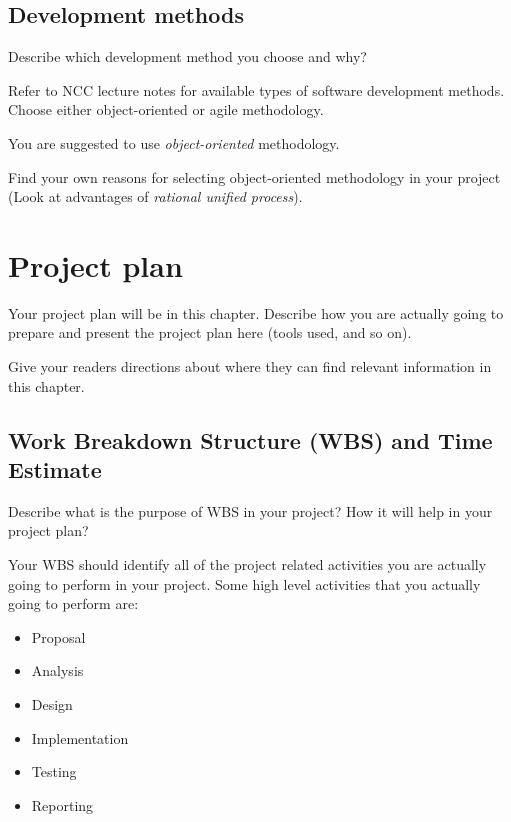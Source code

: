 \documentclass[12pt, a4paper]{report}
\begin{document}
\section{Development methods} %
\label{sec:development_methods}
Describe which development method you choose and why?

Refer to NCC lecture notes for available types of software development methods. Choose either object-oriented or agile methodology.

You are suggested to use \emph{object-oriented} methodology.

Find your own reasons for selecting object-oriented methodology in your project (Look at advantages of \emph{rational unified process}). 

\chapter{Project plan} %
\label{cha:project_plan}
Your project plan will be in this chapter. Describe how you are actually going to prepare and present the project plan here (tools used, and so on).

Give your readers directions about where they can find relevant information in this chapter.

\section{Work Breakdown Structure (WBS) and Time Estimate} %
\label{sec:work_breakdown_structure}
Describe what is the purpose of WBS in your project? How it will help in your project plan?

Your WBS should identify all of the project related activities you are actually going to perform in your project. Some high level activities that you actually going to perform are:
\begin{itemize}
  \item Proposal
  \item Analysis
  \item Design
  \item Implementation
  \item Testing
  \item Reporting
\end{itemize}
\end{document}
